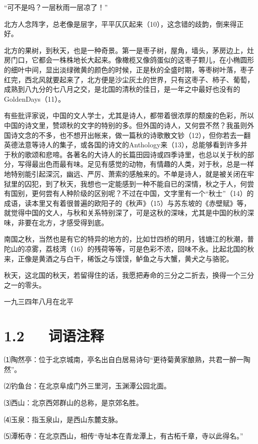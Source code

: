 \documentclass[letterpaper,10pt,english]{sphinxmanual}
\begin{document}
“可不是吗？一层秋雨一层凉了！”

北方人念阵字，总老像是层字，平平仄仄起来（10），这念错的歧韵，倒来得正好。

北方的果树，到秋天，也是一种奇景。第一是枣子树，屋角，墙头，茅房边上，灶房门口，它都会一株株地长大起来。像橄榄又像鸽蛋似的这枣子颗儿，在小椭圆形的细叶中间，显出淡绿微黄的颜色的时候，正是秋的全盛时期，等枣树叶落，枣子红完，西北风就要起来了，北方便是沙尘灰土的世界，只有这枣子、柿子、葡萄，成熟到八九分的七八月之交，是北国的清秋的佳日，是一年之中最好也没有的GoldenDays（11）。

有些批评家说，中国的文人学士，尤其是诗人，都带着很浓厚的颓废的色彩，所以中国的诗文里，赞颂秋的文字的特别的多。但外国的诗人，又何尝不然？我虽则外国诗文念的不多，也不想开出帐来，做一篇秋的诗歌散文钞（12），但你若去一翻英德法意等诗人的集子，或各国的诗文的Anthology来（13），总能够看到许多并于秋的歌颂和悲啼。各著名的大诗人的长篇田园诗或四季诗里，也总以关于秋的部分，写得最出色而最有味。足见有感觉的动物，有情趣的人类，对于秋，总是一样地特别能引起深沉，幽远、严厉、萧索的感触来的。不单是诗人，就是被关闭在牢狱里的囚犯，到了秋天，我想也一定能感到一种不能自已的深情，秋之于人，何尝有国别，更何尝有人种阶级的区别呢？不过在中国，文字里有一个“秋士”（14）的成语，读本里又有着很普遍的欧阳子的《秋声》（15）与苏东坡的《赤壁赋》等，就觉得中国的文人，与秋和关系特别深了，可是这秋的深味，尤其是中国的秋的深味，非要在北方，才感受得到底。

南国之秋，当然也是有它的特异的地方的，比如廿四桥的明月，钱塘江的秋潮，普陀山的凉雾，荔枝湾（16）的残荷等等，可是色彩不浓，回味不永。比起北国的秋来，正像是黄酒之与白干，稀饭之与馍馍，鲈鱼之与大蟹，黄犬之与骆驼。

秋天，这北国的秋天，若留得住的话，我愿把寿命的三分之二折去，换得一个三分之一的零头。

一九三四年八月在北平


\section{1.2   词语注释}
\label{\detokenize{p01_u6563_u6587/_u90c1_u8fbe_u592b-_u53e4_u90fd_u7684_u79cb:id4}}
⑴陶然亭：位于北京城南，亭名出自白居易诗句“更待菊黄家酿熟，共君一醉一陶然”。

⑵钓鱼台：在北京阜成门外三里河，玉渊潭公园北面。

⑶西山：北京西郊群山的总称，是京郊名胜。

⑷玉泉：指玉泉山，是西山东麓支脉。

⑸潭柘寺：在北京西山，相传“寺址本在青龙潭上，有古柘千章，寺以此得名。”
\end{document}
